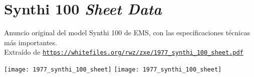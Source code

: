  \chapter[Synthi 100 \textit{Sheet Data}]{Synthi 100 \textit{Sheet Data}}

Anuncio original del model Synthi 100 de EMS, con las especificaciones técnicas más importantes. \\ Extraído de \href{https://whitefiles.org/rwz/zxe/1977\_synthi\_100\_sheet.pdf}{\texttt{https://whitefiles.org/rwz/zxe/1977\_synthi\_100\_sheet.pdf}}


\begin{center}
	\texttt{[image: 1977\_synthi\_100\_sheet]}
	\texttt{[image: 1977\_synthi\_100\_sheet]}
\end{center}



